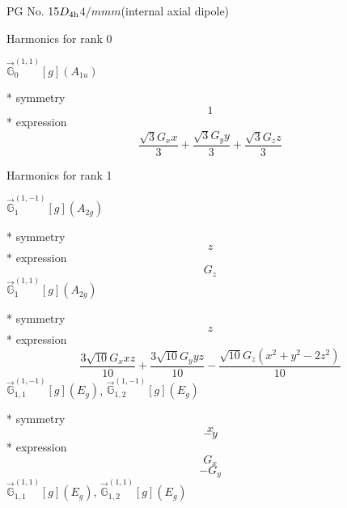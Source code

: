 \documentclass[fleqn,8pt]{jsarticle}
\begin{document}
\setcounter{MaxMatrixCols}{32}

\renewcommand{\tablename}{Table~}
\renewcommand{\figurename}{Figure~}
\begin{center}
\LARGE
PG No. 15\quad$D_{\rm 4h}$\quad$4/mmm$\quad[ tetragonal ] (internal axial dipole)
\end{center}

\noindent * Harmonics for rank 0

\noindent\quad $\vec{\mathbb{G}}_{0}^{(1,1)}[g](A_{1u})$

\noindent\quad ** symmetry
\begin{dmath*}
1
\end{dmath*}
\noindent\quad ** expression
\begin{dmath*}
\frac{\sqrt{3} G_{x} x}{3} + \frac{\sqrt{3} G_{y} y}{3} + \frac{\sqrt{3} G_{z} z}{3}
\end{dmath*}

\noindent * Harmonics for rank 1

\noindent\quad $\vec{\mathbb{G}}_{1}^{(1,-1)}[g](A_{2g})$

\noindent\quad ** symmetry
\begin{dmath*}
z
\end{dmath*}
\noindent\quad ** expression
\begin{dmath*}
G_{z}
\end{dmath*}
\noindent\quad $\vec{\mathbb{G}}_{1}^{(1,1)}[g](A_{2g})$

\noindent\quad ** symmetry
\begin{dmath*}
z
\end{dmath*}
\noindent\quad ** expression
\begin{dmath*}
\frac{3 \sqrt{10} G_{x} x z}{10} + \frac{3 \sqrt{10} G_{y} y z}{10} - \frac{\sqrt{10} G_{z} \left(x^{2} + y^{2} - 2 z^{2}\right)}{10}
\end{dmath*}
\noindent\quad $\vec{\mathbb{G}}_{1,1}^{(1,-1)}[g](E_{g})$, $\vec{\mathbb{G}}_{1,2}^{(1,-1)}[g](E_{g})$

\noindent\quad ** symmetry
\begin{dmath*}
x
\end{dmath*}
\begin{dmath*}
- y
\end{dmath*}
\noindent\quad ** expression
\begin{dmath*}
G_{x}
\end{dmath*}
\begin{dmath*}
- G_{y}
\end{dmath*}
\noindent\quad $\vec{\mathbb{G}}_{1,1}^{(1,1)}[g](E_{g})$, $\vec{\mathbb{G}}_{1,2}^{(1,1)}[g](E_{g})$
\end{document}
